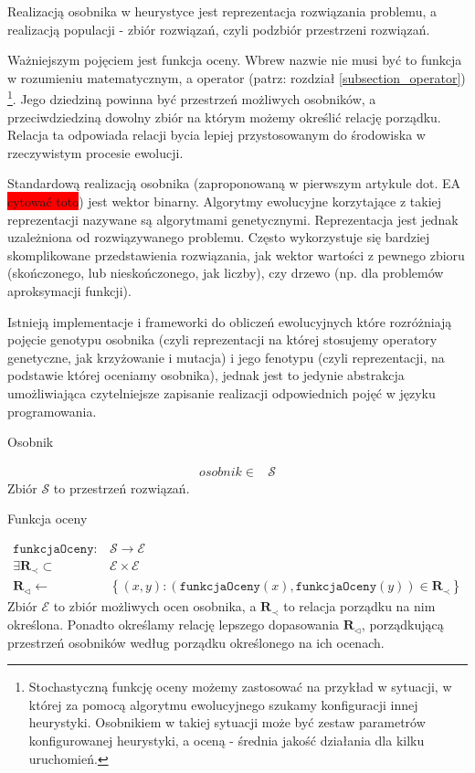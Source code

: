 \documentclass[twoside]{iisthesis}
\newcommand{\todo}{\colorbox{red}}
\newcommand{\important}{\mathcal}
\newcommand{\R}{\mathbf{R}}
\newcommand{\minorityEvalRel}{{\R}_{\prec}}
\newcommand{\minoritySpecimenRel}{{\R}_{\lhd}}
\newcommand{\param}{\mathtt}
\begin{document}
Realizacją osobnika w heurystyce jest reprezentacja rozwiązania problemu, a realizacją populacji - zbiór rozwiązań, czyli podzbiór przestrzeni rozwiązań.

Ważniejszym pojęciem jest funkcja oceny. Wbrew nazwie nie musi być to funkcja w rozumieniu matematycznym, a operator (patrz: rozdział \ref{subsection_operator}) \footnote{Stochastyczną funkcję oceny możemy zastosować na przykład w sytuacji, w której za pomocą algorytmu ewolucyjnego szukamy konfiguracji innej heurystyki. Osobnikiem w takiej sytuacji może być zestaw parametrów konfigurowanej heurystyki, a oceną - średnia jakość działania dla kilku uruchomień.}. Jego dziedziną powinna być przestrzeń możliwych osobników, a przeciwdziedziną dowolny zbiór na którym możemy określić relację porządku. Relacja ta odpowiada relacji bycia lepiej przystosowanym do środowiska w rzeczywistym procesie ewolucji.

Standardową realizacją osobnika (zaproponowaną w pierwszym artykule dot. EA \todo{cytować toto}) jest wektor binarny. Algorytmy ewolucyjne korzytające z takiej reprezentacji nazywane są algorytmami genetycznymi. Reprezentacja jest jednak uzależniona od rozwiązywanego problemu. Często wykorzystuje się bardziej skomplikowane przedstawienia rozwiązania, jak wektor wartości z pewnego zbioru (skończonego, lub nieskończonego, jak liczby), czy drzewo (np. dla problemów aproksymacji funkcji).

Istnieją implementacje i frameworki do obliczeń ewolucyjnych które rozróżniają pojęcie genotypu osobnika (czyli reprezentacji na której stosujemy operatory genetyczne, jak krzyżowanie i mutacja) i jego fenotypu (czyli reprezentacji, na podstawie której oceniamy osobnika), jednak jest to jedynie abstrakcja umożliwiająca czytelniejsze zapisanie realizacji odpowiednich pojęć w języku programowania.

\begin{signature}
	\caption{Osobnik \label{signature_specimen}}
	\begin{align}
	osobnik \in &\important{S}
	\end{align}
	Zbiór $\important{S}$ to przestrzeń rozwiązań.
\end{signature}

\begin{signature}
	\caption{Funkcja oceny \label{signature_eval}}
	\begin{align}
		\param{funkcjaOceny}: &\important{S} \rightarrow \important{E} \\
		\exists \minorityEvalRel \subset &\important{E} \times \important{E} \\
		\minoritySpecimenRel \gets &\left\{ (x, y): (\param{funkcjaOceny}(x), \param{funkcjaOceny}(y)) \in \minorityEvalRel \right\}
	\end{align}
	Zbiór $\important{E}$ to zbiór możliwych ocen osobnika, 
	a $\minorityEvalRel$ to relacja porządku na nim określona. Ponadto określamy relację lepszego dopasowania $\minoritySpecimenRel$, porządkującą przestrzeń osobników według porządku określonego na ich ocenach. 
\end{signature}
\end{document}
